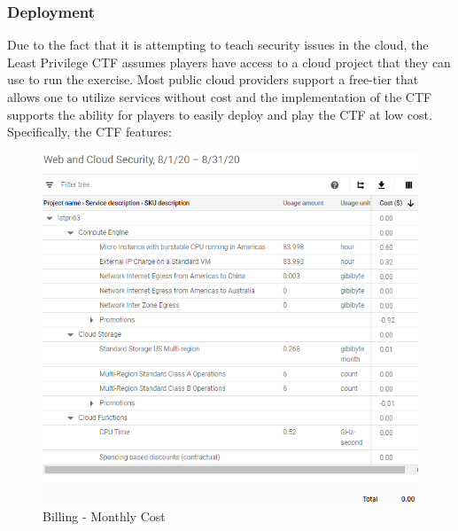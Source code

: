 \subsubsection{Deployment}
Due to the fact that it is attempting to teach security issues in the cloud,
the Least Privilege CTF assumes players have access to a cloud project that they can use to run
the exercise.  Most public cloud providers support a free-tier that allows one to utilize services without cost and the implementation
of the CTF supports the ability for players to easily deploy and play the CTF at low cost.   Specifically, the CTF features:
\begin{figure}[!h]
  \centering
  \includegraphics[width=\linewidth]{pic/cost}
  \caption {Billing - Monthly Cost}
  \label{fig:cost}
\end{figure}

